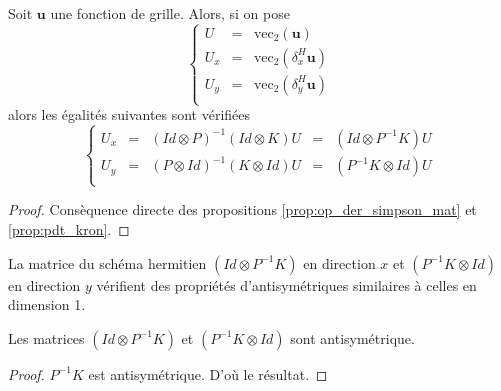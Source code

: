 \begin{theoreme}
Soit $\mathbf{u}$ une fonction de grille. Alors, si on pose 
\begin{equation}
\left\lbrace
\begin{array}{rcl}
U & = & \text{vec}_2 (\mathbf{u}) \\
U_x & = & \text{vec}_2 (\delta_x^H \mathbf{u}) \\
U_y & = & \text{vec}_2 (\delta_y^H \mathbf{u}) \\
\end{array}
\right.
\end{equation}
alors les égalités suivantes sont vérifiées
\begin{equation}
\left\lbrace
\begin{array}{rcccl}
U_x &=& (Id \otimes P)^{-1}(Id \otimes K) U &=& (Id \otimes P^{-1}K)U \\
U_y &=& (P \otimes Id)^{-1}(K \otimes Id) U &=& (P^{-1}K \otimes Id)U\\
\end{array}
\right.
\end{equation}
\end{theoreme}

\begin{proof}
Consèquence directe des propositions \ref{prop:op_der_simpson_mat} et \ref{prop:pdt_kron}.
\end{proof}

La matrice du schéma hermitien $(Id \otimes P^{-1}K)$ en direction $x$ et $(P^{-1}K \otimes Id)$ en direction $y$ vérifient des propriétés d'antisymétriques similaires à celles en dimension 1.
\begin{proposition}
Les matrices $(Id \otimes P^{-1}K)$ et $(P^{-1}K \otimes Id)$ sont antisymétrique.
\end{proposition}

\begin{proof}
$P^{-1}K$ est antisymétrique. D'où le résultat.
\end{proof}















